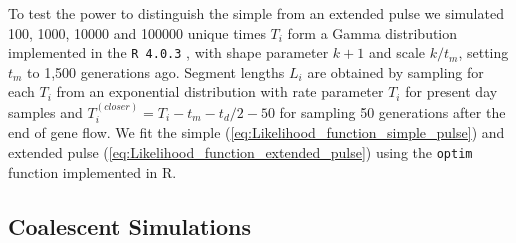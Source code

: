 \documentclass[11pt]{article}
\begin{document}
To test the power to distinguish the simple from an extended pulse we simulated 100, 1000, 10000 and 100000 unique times $T_i$ form a Gamma distribution implemented in the \texttt{R 4.0.3} \citep{R_Core_Team_2019}, with shape parameter $k+1$ and scale  $k/t_m$, setting $t_m$ to 1,500 generations ago.  Segment lengths $L_i$ are obtained by sampling for each $T_i$ from an exponential distribution  with rate parameter $T_i$ for present day samples and $T_i^{(closer)}= T_i - t_m - t_d/2 - 50$ for sampling 50 generations after the end of gene flow.
We fit the simple (\ref{eq:Likelihood_function_simple_pulse}) and extended pulse (\ref{eq:Likelihood_function_extended_pulse}) using the \texttt{optim} function implemented in R.

\subsection{Coalescent Simulations}\label{coalescent simulations}
\end{document}
